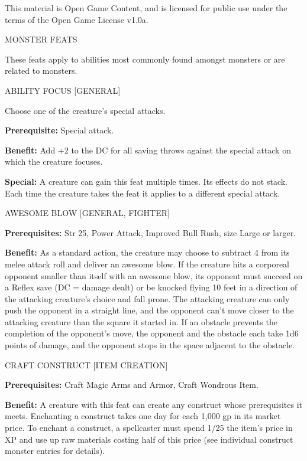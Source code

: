 \documentclass{article}
\begin{document}
This material is Open Game Content, and is licensed for public use under the terms 
of the Open Game License v1.0a.

{\LARGE{}MONSTER FEATS}

These feats apply to abilities most commonly found amongst monsters or are related 
to monsters.

\vspace{12pt}
ABILITY FOCUS  [GENERAL]

Choose one of the creature's special attacks.

\textbf{Prerequisite:} Special attack.

\textbf{Benefit:} Add +2 to the DC for all saving throws against the special attack 
on which the creature focuses.

\textbf{Special:} A creature can gain this feat multiple times. Its effects do 
not stack. Each time the creature takes the feat it applies to a different special 
attack.

\vspace{12pt}
AWESOME BLOW [GENERAL, FIGHTER]

\textbf{Prerequisites:} Str 25, Power Attack, Improved Bull Rush, size Large or 
larger.

\textbf{Benefit:} As a standard action, the creature may choose to subtract 4 from 
its melee attack roll and deliver an awesome blow. If the creature hits a corporeal 
opponent smaller than itself with an awesome blow, its opponent must succeed on 
a Reflex save (DC = damage dealt) or be knocked flying 10 feet in a direction of 
the attacking creature's choice and fall prone. The attacking creature can only 
push the opponent in a straight line, and the opponent can't move closer to the 
attacking creature than the square it started in. If an obstacle prevents the completion 
of the opponent's move, the opponent and the obstacle each take 1d6 points of damage, 
and the opponent stops in the space adjacent to the obstacle.

\vspace{12pt}
CRAFT CONSTRUCT [ITEM CREATION]

\textbf{Prerequisites:} Craft Magic Arms and Armor, Craft Wondrous Item.

\textbf{Benefit:} A creature with this feat can create any construct whose prerequisites 
it meets. Enchanting a construct takes one day for each 1,000 gp in its market 
price. To enchant a construct, a spellcaster must spend 1/25 the item's price in 
XP and use up raw materials costing half of this price (see individual construct 
monster entries for details).
\end{document}
